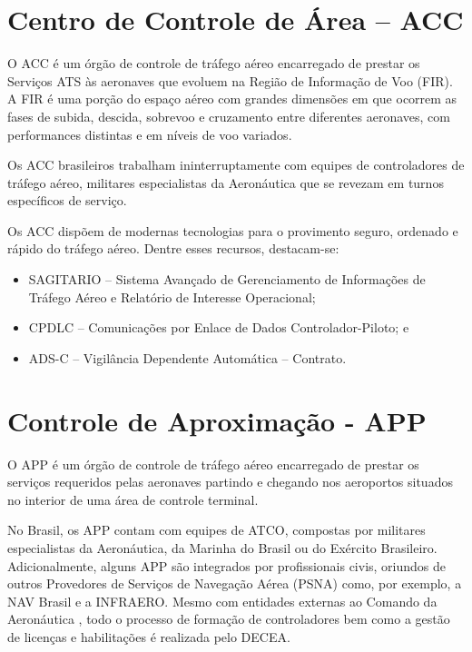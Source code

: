\documentclass[
]{book}
\providecommand{\tightlist}{%
  \setlength{\itemsep}{0pt}\setlength{\parskip}{0pt}}
\begin{document}
\hypertarget{centro-de-controle-de-uxe1rea-acc}{%
\section{Centro de Controle de Área -- ACC}\label{centro-de-controle-de-uxe1rea-acc}}

O ACC é um órgão de controle de tráfego aéreo encarregado de prestar os Serviços ATS às aeronaves que evoluem na Região de Informação de Voo (FIR). A FIR é uma porção do espaço aéreo com grandes dimensões em que ocorrem as fases de subida, descida, sobrevoo e cruzamento entre diferentes aeronaves, com performances distintas e em níveis de voo variados.

Os ACC brasileiros trabalham ininterruptamente com equipes de controladores de tráfego aéreo, militares especialistas da Aeronáutica que se revezam em turnos específicos de serviço.

Os ACC dispõem de modernas tecnologias para o provimento seguro, ordenado e rápido do tráfego aéreo. Dentre esses recursos, destacam-se:

\begin{itemize}
\tightlist
\item
  SAGITARIO -- Sistema Avançado de Gerenciamento de Informações de Tráfego Aéreo e Relatório de Interesse Operacional;
\item
  CPDLC -- Comunicações por Enlace de Dados Controlador-Piloto; e
\item
  ADS-C -- Vigilância Dependente Automática -- Contrato.
\end{itemize}

\hypertarget{controle-de-aproximauxe7uxe3o---app}{%
\section{Controle de Aproximação - APP}\label{controle-de-aproximauxe7uxe3o---app}}

O APP é um órgão de controle de tráfego aéreo encarregado de prestar os serviços requeridos pelas aeronaves partindo e chegando nos aeroportos situados no interior de uma área de controle terminal.

No Brasil, os APP contam com equipes de ATCO, compostas por militares especialistas da Aeronáutica, da Marinha do Brasil ou do Exército Brasileiro. Adicionalmente, alguns APP são integrados por profissionais civis, oriundos de outros Provedores de Serviços de Navegação Aérea (PSNA) como, por exemplo, a NAV Brasil e a INFRAERO. Mesmo com entidades externas ao Comando da Aeronáutica , todo o processo de formação de controladores bem como a gestão de licenças e habilitações é realizada pelo DECEA.
\end{document}
